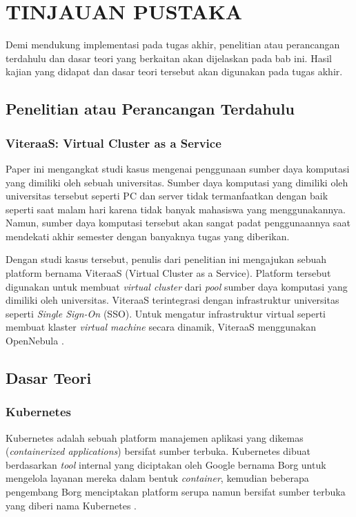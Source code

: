 \chapter{TINJAUAN PUSTAKA}
\label{chap:tinjauanpustaka}

Demi mendukung implementasi pada tugas akhir, penelitian atau perancangan terdahulu dan dasar teori
yang berkaitan akan dijelaskan pada bab ini. Hasil kajian yang didapat
dan dasar teori tersebut akan digunakan pada tugas akhir.

\section{Penelitian atau Perancangan Terdahulu}

\subsection{ViteraaS: Virtual Cluster as a Service}

Paper ini mengangkat studi kasus mengenai penggunaan sumber daya komputasi
yang dimiliki oleh sebuah universitas. Sumber daya komputasi yang dimiliki
oleh universitas tersebut seperti PC dan server tidak termanfaatkan dengan
baik seperti saat malam hari karena tidak banyak mahasiswa yang menggunakannya.
Namun, sumber daya komputasi tersebut akan sangat padat penggunaannya saat
mendekati akhir semester dengan banyaknya tugas yang diberikan.

Dengan studi kasus tersebut, penulis dari penelitian ini mengajukan sebuah
platform bernama ViteraaS (Virtual Cluster as a Service). Platform tersebut
digunakan untuk membuat \emph{virtual cluster} dari \emph{pool} sumber daya
komputasi yang dimiliki oleh universitas. ViteraaS terintegrasi dengan
infrastruktur universitas seperti \emph{Single Sign-On} (SSO). Untuk mengatur
infrastruktur virtual seperti membuat klaster \emph{virtual machine} secara dinamik,
ViteraaS menggunakan OpenNebula \parencite{6133210}.

\section{Dasar Teori}

\subsection{Kubernetes}
\label{sec:kubernetes}

Kubernetes adalah sebuah platform manajemen aplikasi yang dikemas (\emph{containerized applications})
bersifat sumber terbuka. Kubernetes dibuat berdasarkan \emph{tool} internal yang
diciptakan oleh Google bernama Borg untuk mengelola layanan mereka dalam bentuk \emph{container},
kemudian beberapa pengembang Borg menciptakan platform serupa
namun bersifat sumber terbuka yang diberi nama Kubernetes \parencite{borg-references}.

